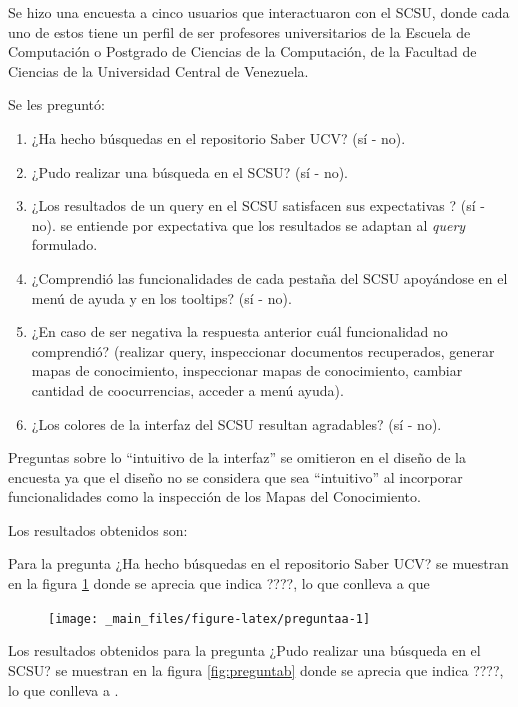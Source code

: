 \documentclass[
  12pt,
  openany]{book}
\begin{document}
Se hizo una encuesta a cinco usuarios que interactuaron con el SCSU, donde cada uno de estos tiene un perfil de ser profesores universitarios de la Escuela de Computación o Postgrado de Ciencias de la Computación, de la Facultad de Ciencias de la Universidad Central de Venezuela.

Se les preguntó:

\begin{enumerate}
\def\labelenumi{\arabic{enumi}.}
\item
  ¿Ha hecho búsquedas en el repositorio Saber UCV? (sí - no).
\item
  ¿Pudo realizar una búsqueda en el SCSU? (sí - no).
\item
  ¿Los resultados de un query en el SCSU satisfacen sus expectativas ? (sí - no). se entiende por expectativa que los resultados se adaptan al \emph{query} formulado.
\item
  ¿Comprendió las funcionalidades de cada pestaña del SCSU apoyándose en el menú de ayuda y en los tooltips? (sí - no).
\item
  ¿En caso de ser negativa la respuesta anterior cuál funcionalidad no comprendió? (realizar query, inspeccionar documentos recuperados, generar mapas de conocimiento, inspeccionar mapas de conocimiento, cambiar cantidad de coocurrencias, acceder a menú ayuda).
\item
  ¿Los colores de la interfaz del SCSU resultan agradables? (sí - no).
\end{enumerate}

Preguntas sobre lo ``intuitivo de la interfaz'' se omitieron en el diseño de la encuesta ya que el diseño no se considera que sea ``intuitivo'' al incorporar funcionalidades como la inspección de los Mapas del Conocimiento.

Los resultados obtenidos son:

Para la pregunta ¿Ha hecho búsquedas en el repositorio Saber UCV? se muestran en la figura \ref{fig:preguntaa} donde se aprecia que indica ????, lo que conlleva a que

\begin{figure}

{\centering \texttt{[image: \_main\_files/figure-latex/preguntaa-1]} 

}

\caption{ }\label{fig:preguntaa}
\end{figure}

Los resultados obtenidos para la pregunta ¿Pudo realizar una búsqueda en el SCSU? se muestran en la figura \ref{fig:preguntab} donde se aprecia que indica ????, lo que conlleva a .
\end{document}
